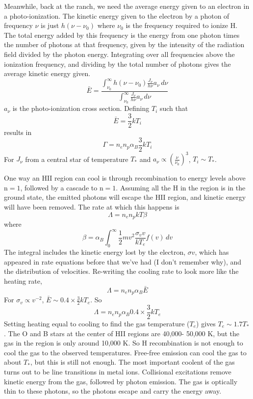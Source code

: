 Meanwhile, back at the ranch, we need the average energy given to an electron 
in a photo-ionization.  The kinetic energy given to the electron by a photon 
of frequency $\nu$ is just $h(\nu-\nu_0)$ where $\nu_0$ is the frequency 
required to ionize H.  The total energy added by this frequency is the 
energy from one photon times the number of photons at that frequency, given 
by the intensity of the radiation field divided by the photon energy.  
Integrating over all frequencies above the ionization frequency, and dividing 
by the total number of photons gives the average kinetic energy given.   
\begin{equation}
\bar{E}=\frac{\int_{\nu_0}^\infty{h(\nu-\nu_0)\frac{J_{\nu}}{h\nu}a_{\nu}\,d\nu}}{\int_{\nu_0}^\infty{\frac{J_{\nu}}{h\nu}a_{\nu}\,d\nu}}
\end{equation}
$a_{\nu}$ is the photo-ionization cross section.  Defining $T_i$ such that 
\begin{equation}
\bar{E}=\frac{3}{2}kT_i
\end{equation}
results in 
\begin{equation}
\Gamma=n_en_p\alpha_B\frac{3}{2}kT_i
\end{equation}
For $J_{\nu}$ from a central star of temperature $T_*$ and 
$a_{\nu}\propto\left(\frac{\nu}{\nu_0}\right)^3$, $T_i\sim T_*$.

One way an HII region can cool is through recombination to energy levels 
above n$=1$, followed by a cascade to n$=1$.  Assuming all the H in the region 
is in the ground state, the emitted photons will escape the HII region, and 
kinetic energy will have been removed.  The rate at which this happens is 
\begin{equation}
\Lambda=n_en_pkT\beta
\end{equation}
where 
\begin{equation}
\beta=\alpha_B\int_0^\infty{\frac{1}{2}mv^2\frac{\sigma_vv}{kT_e}f(v)\,dv}
\end{equation}
The integral includes the kinetic energy lost by the electron, $\sigma v$, 
which has appeared in rate equations before that we've had (I don't remember 
why), and the distribution of velocities.  Re-writing the cooling rate to 
look more like the heating rate,
\begin{equation}
\Lambda=n_en_p\alpha_B\bar{E}
\end{equation}
For $\sigma_v\propto v^{-2}$, $\bar{E}\sim0.4\times\frac{3}{2}kT_e$.
So
\begin{equation}
\Lambda=n_en_p\alpha_B0.4\times\frac{3}{2}kT_e
\end{equation}
Setting heating equal to cooling to find the gas temperature ($T_e$) gives
$T_e\sim1.7T_*$.  The O and B stars at the center of HII regions are 40,000-
50,000 K, but the gas in the region is only around 10,000 K.  So H 
recombination is not enough to cool the gas to the observed temperatures.  
Free-free emission can cool the gas to about $T_*$, but this is still not 
enough.  The most important coolent of the gas turns out to be line transitions 
in metal ions.  Collisional excitations remove kinetic energy from the gas, 
followed by photon emission.  The gas is optically thin to these photons, 
so the photons escape and carry the energy away.

